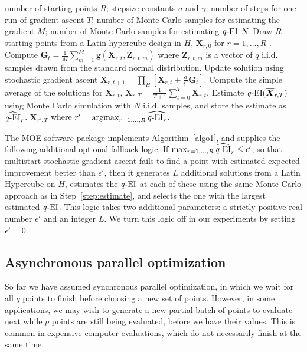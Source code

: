 \documentclass[paper=letter]{scrartcl}
\newcommand{\argmax}{\operatornamewithlimits{argmax}}
\newcommand{\qEI}{\text{\textit q-EI}}
\begin{document}
\begin{algorithm}
\caption{MOE-qEI: Optimization of $\qEI$}\label{algo1}
\begin{algorithmic}[1]
\REQUIRE number of starting points $R$; stepsize constants $a$
and $\gamma$; number of steps for one run of gradient ascent $T$;  
number of Monte Carlo samples for estimating the gradient $M$; number of 
Monte Carlo samples for estimating $\qEI$ $N$.
\STATE Draw $R$ starting points from a Latin hypercube design in $H$, $\bm{X}_{r,0}$ for $r=1,\ldots,R$ .
\STATE Compute $\bm{G}_t = \frac{1}{M} \sum_{m=1}^M \bm{g}(\bm{X}_{r,t},\bm{Z}_{r,t,m})$ 
where $\bm{Z}_{r,t,m}$ is a vector of $q$ i.i.d. samples drawn from the standard normal distribution.
\STATE Update solution using stochastic gradient ascent $\bm{X}_{r,t+1} = \prod_{H} \left[ \bm{X}_{r,t} + \frac{a}{t^{\gamma}} \bm{G}_t \right]$.
\ENDFOR
\label{step:polyak-ruppert}
\STATE Compute the simple average of the solutions for $\bm{X}_{r,t}$, $\overline{\bm{X}}_{r,T} = \frac{1}{T+1} \sum_{t=0}^T\bm{X}_{r, t}$. \label{step:done_start}
\STATE Estimate $\qEI (\overline{\bm{X}}_{r,T})$ using Monte Carlo simulation with $N$ i.i.d. samples, and store the estimate as $\widehat{\qEI}_r$.  \label{step:estimate}
\ENDFOR
\RETURN $\overline{\bm{X}}_{r',T}$ where $r' = \argmax_{r=1,\ldots,R} \widehat{\qEI_r}$.
\end{algorithmic}
\end{algorithm}

The MOE software package \citep{moe-github2015} implements Algorithm~\ref{algo1},
and supplies the following additional optional fallback logic.  
If $\max_{r=1,\ldots,R} \widehat{\qEI}_r \le \epsilon'$, 
so that multistart stochastic gradient ascent fails to find a point with estimated 
expected improvement better than $\epsilon'$, then it generates $L$ additional 
solutions from a Latin Hypercube on $H$, estimates the $\qEI$
at each of these using the same Monte Carlo approach as in Step~\ref{step:estimate}, 
and selects the one with the largest estimated $\qEI$.
This logic takes two additional parameters: a strictly positive real number 
$\epsilon'$ and an integer $L$.  
We turn this logic off in our experiments by setting $\epsilon'=0$.

\subsection{Asynchronous parallel optimization} \label{sec:async}
So far we have assumed synchronous parallel optimization, in which we wait for all $q$ points to finish before choosing a new set of points.
However, in some applications, we may wish to generate a new partial batch of points to evaluate next while $p$ points are still being evaluated, before we have 
their values. This is common in expensive computer evaluations, which do not necessarily finish at the same time.
\end{document}
